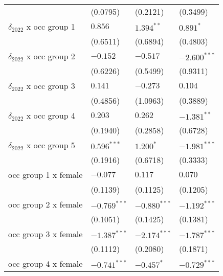 \begin{tabular}{llll}
                                       &           (0.0795) &           (0.2121) &           (0.3499) \\
$\delta_{2022}$ x occ group 1          &            $0.856$ &       $1.394^{**}$ &          $0.891^*$ \\
                                       &           (0.6511) &           (0.6894) &           (0.4803) \\
$\delta_{2022}$ x occ group 2          &           $-0.152$ &           $-0.517$ &     $-2.600^{***}$ \\
                                       &           (0.6226) &           (0.5499) &           (0.9311) \\
$\delta_{2022}$ x occ group 3          &            $0.141$ &           $-0.273$ &            $0.104$ \\
                                       &           (0.4856) &           (1.0963) &           (0.3889) \\
$\delta_{2022}$ x occ group 4          &            $0.203$ &            $0.262$ &      $-1.381^{**}$ \\
                                       &           (0.1940) &           (0.2858) &           (0.6728) \\
$\delta_{2022}$ x occ group 5          &      $0.596^{***}$ &          $1.200^*$ &     $-1.981^{***}$ \\
                                       &           (0.1916) &           (0.6718) &           (0.3333) \\
occ group 1 x female                   &           $-0.077$ &            $0.117$ &            $0.070$ \\
                                       &           (0.1139) &           (0.1125) &           (0.1205) \\
occ group 2 x female                   &     $-0.769^{***}$ &     $-0.880^{***}$ &     $-1.192^{***}$ \\
                                       &           (0.1051) &           (0.1425) &           (0.1381) \\
occ group 3 x female                   &     $-1.387^{***}$ &     $-2.174^{***}$ &     $-1.787^{***}$ \\
                                       &           (0.1112) &           (0.2080) &           (0.1871) \\
occ group 4 x female                   &     $-0.741^{***}$ &         $-0.457^*$ &     $-0.729^{***}$ \\

\end{tabular}
